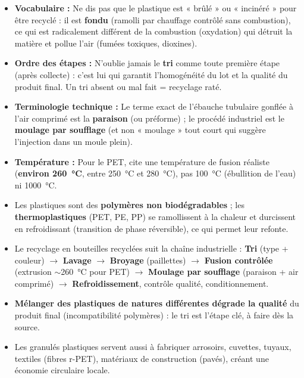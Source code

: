\documentclass[11pt]{article}
\begin{document}
\begin{attention}
\begin{itemize}
\item \textbf{Vocabulaire :} Ne dis pas que le plastique est « brûlé » ou « incinéré » pour être recyclé : il est \textbf{fondu} (ramolli par chauffage contrôlé sans combustion), ce qui est radicalement différent de la combustion (oxydation) qui détruit la matière et pollue l'air (fumées toxiques, dioxines).
\item \textbf{Ordre des étapes :} N'oublie jamais le \textbf{tri} comme toute première étape (après collecte) : c'est lui qui garantit l'homogénéité du lot et la qualité du produit final. Un tri absent ou mal fait = recyclage raté.
\item \textbf{Terminologie technique :} Le terme exact de l'ébauche tubulaire gonflée à l'air comprimé est la \textbf{paraison} (ou préforme) ; le procédé industriel est le \textbf{moulage par soufflage} (et non « moulage » tout court qui suggère l'injection dans un moule plein).
\item \textbf{Température :} Pour le PET, cite une température de fusion réaliste (\textbf{environ \SI{260}{\celsius}}, entre \SI{250}{\celsius} et \SI{280}{\celsius}), pas \SI{100}{\celsius} (ébullition de l'eau) ni \SI{1000}{\celsius}.
\end{itemize}
\end{attention}

\begin{aretenir}
\begin{itemize}
\item Les plastiques sont des \textbf{polymères non biodégradables} ; les \textbf{thermoplastiques} (PET, PE, PP) se ramollissent à la chaleur et durcissent en refroidissant (transition de phase réversible), ce qui permet leur refonte.
\item Le recyclage en bouteilles recyclées suit la chaîne industrielle : \textbf{Tri} (type + couleur) $\rightarrow$ \textbf{Lavage} $\rightarrow$ \textbf{Broyage} (paillettes) $\rightarrow$ \textbf{Fusion contrôlée} (extrusion $\sim$\SI{260}{\celsius} pour PET) $\rightarrow$ \textbf{Moulage par soufflage} (paraison + air comprimé) $\rightarrow$ \textbf{Refroidissement}, contrôle qualité, conditionnement.
\item \textbf{Mélanger des plastiques de natures différentes dégrade la qualité} du produit final (incompatibilité polymères) : le tri est l'étape clé, à faire dès la source.
\item Les granulés plastiques servent aussi à fabriquer arrosoirs, cuvettes, tuyaux, textiles (fibres r-PET), matériaux de construction (pavés), créant une économie circulaire locale.
\end{itemize}
\end{aretenir}
\end{document}
